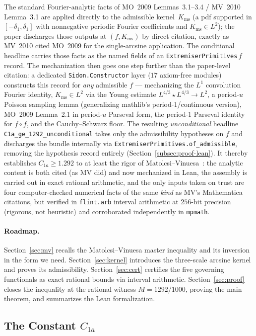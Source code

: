 \documentclass[11pt, letterpaper]{article}
\theoremstyle{paperplain}
\theoremstyle{paperdef}
\newcommand{\Kms}{K_{\mathrm{ms}}}
\begin{document}
The standard Fourier-analytic facts of MO~2009 Lemmas~3.1--3.4 /
MV~2010 Lemma~3.1 are applied directly to the admissible
kernel~$\Kms$ (a pdf supported in $[-\delta_1,\delta_1]$ with
nonnegative periodic Fourier coefficients and $\Kms\in L^2$); the
paper discharges those outputs at $(f,\Kms)$ by direct citation,
exactly as MV~2010 cited MO~2009 for the single-arcsine application.
The conditional headline carries those facts as the named fields of
an \texttt{ExtremiserPrimitives}\,$f$ record.  The mechanization then
goes one step further than the paper-level citation: a dedicated
\texttt{Sidon.Constructor} layer ($17$ axiom-free modules) constructs
this record for \emph{any} admissible $f$ --- mechanizing the $L^1$
convolution Fourier identity, $\Kms\in L^2$ via the Young estimate
$L^{4/3}\!\star L^{4/3}\!\to L^2$, a period-$u$ Poisson sampling
lemma (generalizing mathlib's period-$1$/continuous version),
MO~2009 Lemma~2.1 in period-$u$ Parseval form, the period-$1$
Parseval identity for $f\circ f$, and the Cauchy--Schwarz floor.  The
resulting \emph{unconditional} headline
\texttt{C1a\_ge\_1292\_unconditional} takes only the admissibility
hypotheses on $f$ and discharges the bundle internally via
\texttt{ExtremiserPrimitives.of\_admissible}, removing the hypothesis
record entirely (Section~\ref{subsec:proof-lean}).  It thereby
establishes $C_{1a}\ge 1.292$ to at least the rigor of
Matolcsi--Vinuesa~\cite{MV10}: the analytic content is both cited (as
MV did) and now mechanized in Lean, the assembly is carried out in
exact rational arithmetic, and the only inputs taken on trust are
four computer-checked numerical facts of the same \emph{kind} as
MV's Mathematica citations, but verified in \texttt{flint.arb}
interval arithmetic at $256$-bit precision (rigorous, not heuristic)
and corroborated independently in \texttt{mpmath}.

\paragraph{Roadmap.}
Section~\ref{sec:mv} recalls the Matolcsi--Vinuesa master inequality
and its inversion in the form we need.
Section~\ref{sec:kernel} introduces the three-scale arcsine kernel and
proves its admissibility.  Section~\ref{sec:cert} certifies the five
governing functionals as exact rational bounds via interval
arithmetic.  Section~\ref{sec:proof} closes the inequality at the
rational witness $M=1292/1000$, proving the main theorem, and
summarizes the Lean formalization.

\subsection{The Constant \texorpdfstring{$C_{1a}$}{C1a}}\label{subsec:intro-constant}
\end{document}
